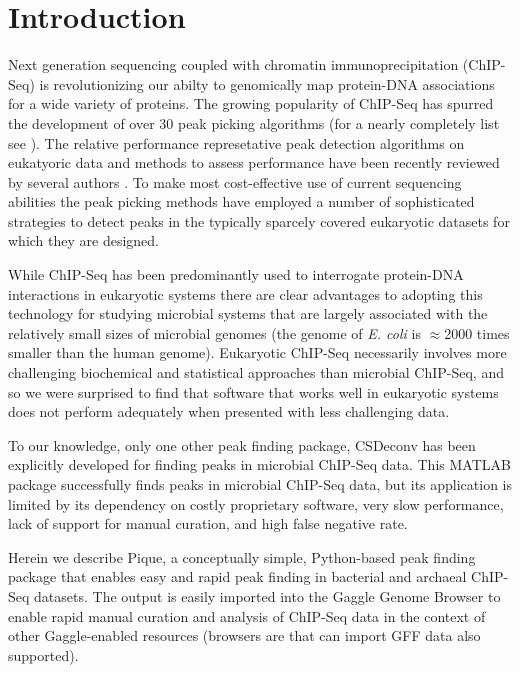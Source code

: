 \documentclass{bioinfo} %
\begin{document}
\section{Introduction}

\noindent Next generation sequencing coupled with chromatin
immunoprecipitation (ChIP-Seq) is revolutionizing our abilty to
genomically map protein-DNA associations for a wide variety of proteins.
The growing popularity of ChIP-Seq has spurred the development of over
30 peak picking algorithms (for a nearly completely list see
\cite{wilbanks}). The relative performance represetative peak detection
algorithms on eukatyoric data and methods to assess performance have
been recently reviewed by several authors \cite{Pepke, Laajala_review,
too_many_peak_callers, peakranger, peak_benchmark}.  To make most
cost-effective use of current sequencing abilities the peak picking
methods have employed a number of sophisticated strategies to detect
peaks in the typically sparcely covered eukaryotic datasets for which
they are designed.

While ChIP-Seq has been predominantly used to interrogate protein-DNA
interactions in eukaryotic systems there are clear advantages to
adopting this technology for studying microbial systems that are largely
associated with the relatively small sizes of microbial genomes (the
genome of {\em E. coli} is $\approx$2000 times smaller than the human
genome). Eukaryotic ChIP-Seq necessarily involves more challenging
biochemical and statistical approaches than microbial ChIP-Seq, and so
we were surprised to find that software that works well in eukaryotic
systems does not perform adequately when presented with less challenging
data.

To our knowledge, only one other peak finding package, CSDeconv
\cite{CSDeconv} has been explicitly developed for finding peaks in
microbial ChIP-Seq data. This MATLAB package successfully finds peaks in
microbial ChIP-Seq data, but its application is limited by its
dependency on costly proprietary software, very slow performance, lack
of support for manual curation, and high false negative rate.

Herein we describe Pique, a conceptually simple, Python-based peak
finding package that enables easy and rapid peak finding in bacterial
and archaeal ChIP-Seq datasets.  The output is easily imported into the
Gaggle Genome Browser \cite{ggb} to enable rapid manual curation and
analysis of ChIP-Seq data in the context of other Gaggle-enabled
\cite{gaggle} resources (browsers are that can import GFF data also
supported).
\end{document}
